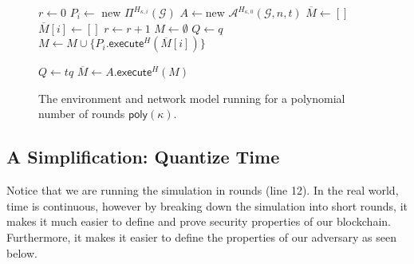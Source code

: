 \begin{figure}[H]
\begin{algorithm}[H]
    \caption{\label{alg.environment} The environment and network model running for a polynomial number of rounds $\textsf{poly}(\kappa)$.}
    \begin{algorithmic}[1]
        \State $r \leftarrow 0$
                \State $P_i \leftarrow$ {\textsf{new }} $\Pi^{H_{\kappa,i}}(\mathcal{G})$
            \EndFor
            \State $A \leftarrow${\textsf{new }} $\mathcal{A}^{H_{\kappa,0}}(\mathcal{G}, n, t)$
            \State $\overline{M} \leftarrow []$ 
                \State $\overline{M}[i] \leftarrow []$ 
            \EndFor
             
                \State $r \leftarrow r + 1$
                \State $M \leftarrow \emptyset$
                 
                    \State $Q \leftarrow q$ 
                    \State $M \leftarrow M \cup \{P_i.\textsf{execute}^H(\overline{M}[i])\}$ 

                \EndFor
                \State $Q \leftarrow tq$ 
                \State $\overline{M} \leftarrow A.\textsf{execute}^H(M)$
                        \label{alg.environment.connectivity}
                    \EndFor
                \EndFor
            \EndWhile
        \EndFunction
        \vskip8pt
    \end{algorithmic}
\end{algorithm}
\end{figure}

\subsection{A Simplification: Quantize Time}
Notice that we are running the simulation in rounds (line 12). In the real world, time is continuous, however by breaking down the simulation into short rounds, it makes it much easier to define and prove security properties of our blockchain. Furthermore, it makes it easier to define the properties of our adversary as seen below.


